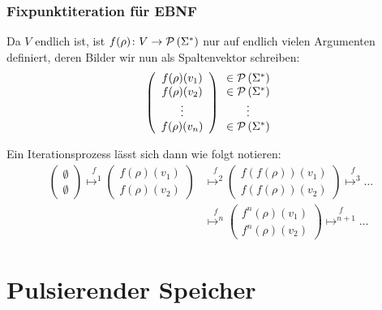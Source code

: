 \documentclass{beamer}
\begin{document}
\begin{frame} \frametitle{Fixpunktiteration für EBNF}
	Da $V$ endlich ist, ist $f(\rho) \colon V \to \mathcal{P}\left( \Sigma^\ast \right)$ nur auf endlich vielen Argumenten definiert, deren Bilder wir nun als Spaltenvektor schreiben:
	\begin{equation*}
		\left(
		\begin{array}{c}
			f(\rho)(v_1) \\
			f(\rho)(v_2) \\
			\vdots \\
			f(\rho)(v_n)
		\end{array}
		\right)
		\begin{array}{c}
			\in \mathcal{P}\left( \Sigma^\ast \right) \\
			\in \mathcal{P}\left( \Sigma^\ast \right) \\
			\vdots \\
			\in \mathcal{P}\left( \Sigma^\ast \right)
		\end{array}
	\end{equation*}
	
	\pause
	Ein Iterationsprozess lässt sich dann wie folgt notieren:
	\begin{align*}
		\begin{pmatrix} \emptyset \\ \emptyset \end{pmatrix}
		\overset{f}{\mapsto^1}
		\begin{pmatrix} f(\rho)(v_1) \\ f(\rho)(v_2) \end{pmatrix}
		&\overset{f}{\mapsto^2}
		\begin{pmatrix} f(f(\rho))(v_1) \\ f(f(\rho))(v_2) \end{pmatrix}
		\overset{f}{\mapsto^3}
		\dots \\
		&\overset{f}{\mapsto^n}
		\begin{pmatrix} f^n(\rho)(v_1) \\ f^n(\rho)(v_2) \end{pmatrix}
		\overset{f}{\mapsto^{n+1}}
		\dots
	\end{align*}
\end{frame}


\section{Pulsierender Speicher}
\end{document}
